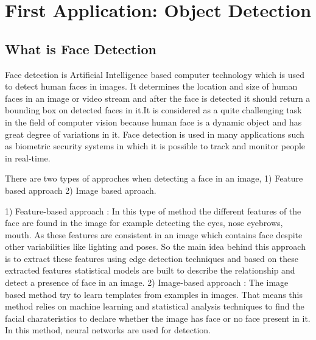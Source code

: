 \chapter{First Application: Object Detection}

\section{What is Face Detection}
Face detection is Artificial Intelligence based computer technology which is used to detect human faces in images.
It determines the location and size of human faces in an image or video stream and after the face is detected it should return a bounding box on detected faces in it.It is considered as a quite challenging task in the field of computer vision because human face is a dynamic object and has great degree of variations in it. Face detection is used in many applications such as biometric security systems in which it is possible to track and monitor people in real-time.

There are two types of approches when detecting a face in an image, 1) Feature based approach 2) Image based aproach.

1) Feature-based approach : In this type of method the different features of the face  are found in the image for example detecting the eyes, nose eyebrows, mouth. As these features are consistent in an image which contains face despite other variabilities like lighting and poses. So the main idea behind this approach is to extract these features using edge detection techniques and based on these extracted features statistical models are built to describe the relationship and detect a presence of face in an image.
2) Image-based approach : The image based method try to learn templates from examples in images. That means this method relies on machine learning and statistical analysis techniques to find the facial charateristics to declare whether the image has face or no face present in it. In this method, neural networks are used for detection. 



